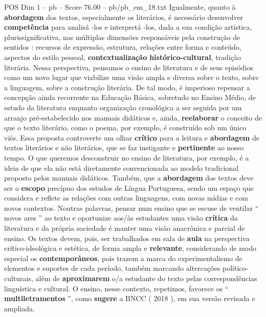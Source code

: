 \begin{textsample}{POS Dim 1 – pb – Score 76.00 – pb/pb\_em\_18.txt}
Igualmente, quanto à \textbf{abordagem} dos textos, especialmente os literários, é necessário desenvolver \textbf{competência} para analisá -los e interpretá -los, dada a sua condição artística, plurissignificativa, nas múltiplas dimensões responsáveis pela construção de sentidos : recursos de expressão, estrutura, relações entre forma e conteúdo, aspectos do estilo pessoal, \textbf{contextualização} \textbf{histórico-cultural}, tradição literária.
Nessa perspectiva, pensamos o ensino de literatura e de seus episódios como um novo lugar que viabilize uma visão ampla e diversa sobre o texto, sobre a linguagem, sobre a construção literária.
De tal modo, é imperioso repensar a concepção ainda recorrente na Educação Básica, sobretudo no Ensino Médio, de estudo da literatura enquanto organização cronológica a ser seguida por um arranjo pré-estabelecido nos manuais didáticos e, ainda, \textbf{reelaborar} o conceito de que o texto literário, como o poema, por exemplo, é construído sob um único viés.
Essa proposta controverte um olhar \textbf{crítico} para a leitura e \textbf{abordagem} de textos literários e não literários, que se faz instigante e \textbf{pertinente} ao nosso tempo.
O que queremos desconstruir no ensino de literatura, por exemplo, é a ideia de que ela não está diretamente convencionada ao modelo tradicional proposto pelos manuais didáticos.
Também, que a \textbf{abordagem} dos textos deve ser o \textbf{escopo} precípuo dos estudos de Língua Portuguesa, sendo um espaço que considera e reflete as relações com outras linguagens, com novas mídias e com novos contextos.
Noutras palavras, pensar num ensino que se escuse de ventilar “ novos ares ” ao texto e oportunize aos/às estudantes uma visão \textbf{crítica} da literatura e da própria sociedade é manter uma visão anacrônica e parcial de ensino.
Os textos devem, pois, ser trabalhados em sala de \textbf{aula} na perspectiva crítico-ideológica e estética, de forma ampla e \textbf{relevante}, considerando de modo especial os \textbf{contemporâneos}, pois trazem a marca do experimentalismo de elementos e suportes de cada período, também marcando altercações político-culturais, além de \textbf{aproximarem} o/a estudante do texto pelas correspondências linguística e cultural.
O ensino, nesse contexto, repetimos, favorece os “ \textbf{multiletramentos} ”, como \textbf{sugere} a BNCC ( 2018 ), em sua versão revisada e ampliada.

\end{textsample}
